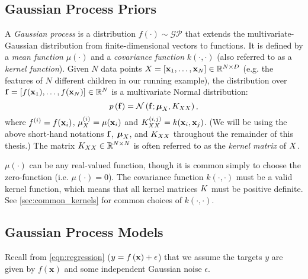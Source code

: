 \subsection{Gaussian Process Priors}
A \emph{Gaussian process} is a distribution $f(\cdot) \sim \mathcal{GP}$ that extends the multivariate-Gaussian distribution from finite-dimensional vectors to functions.
It is defined by a \emph{mean function} $\mu(\cdot)$ and a \emph{covariance function} $k(\cdot, \cdot)$ (also referred to as a \emph{kernel function}).
Given $N$ data points $X = [ \mathbf{x}_1, \ldots, \mathbf{x}_N ] \in \mathbb{R}^{N \times D}$ (e.g. the features of $N$ different children in our running example),
the distribution over $\mathbf{f} = [ f(\mathbf{x}_1), \ldots, f(\mathbf{x}_N) ] \in \mathbb{R}^{N}$ is a multivariate Normal distribution:
\begin{equation}
 p \left( \mathbf{f} \right) = \mathcal{N} \left(  \mathbf{f} ; \boldsymbol{\mu}_{X},  K_{XX}  \right),
 \label{eqn:prior_finite}
\end{equation}
where $f^{(i)} = f(\mathbf{x}_i)$, $\mu^{(i)}_{X} = \mu( \mathbf{x}_i )$ and $K_{XX}^{(i,j)} = k(\mathbf{x}_i, \mathbf{x}_j)$.
(We will be using the above short-hand notations $\mathbf{f}$, $\boldsymbol{\mu}_{X}$, and $K_{XX}$ throughout the remainder of this thesis.)
The matrix $K_{XX} \in \mathbb{R}^{N \times N}$ is often referred to as the \emph{kernel matrix} of $X$.

$\mu(\cdot)$ can be any real-valued function, though it is common simply to choose the zero-function (i.e. $\mu(\cdot) = 0$).
The covariance function $k(\cdot, \cdot)$ must be a valid kernel function, which means that all kernel matrices $K$ must be positive definite.
See \autoref{sec:common_kernels} for common choices of $k(\cdot, \cdot)$.

\subsection{Gaussian Process Models}
Recall from \autoref{eqn:regression} ($y = f \left( \mathbf{x} \right) + \epsilon$) that we assume the targets $y$ are given by $f(\mathbf x)$ and some independent Gaussian noise $\epsilon$.

